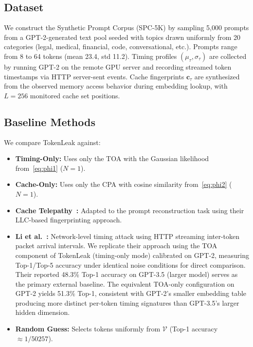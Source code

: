 \documentclass[journal,10pt,twocolumn]{IEEEtran}
\begin{document}
\subsection{Dataset}

We construct the Synthetic Prompt Corpus (SPC-5K) by sampling
5{,}000 prompts from a GPT-2-generated text pool seeded with
topics drawn uniformly from 20 categories (legal, medical,
financial, code, conversational, etc.). Prompts range from
8 to 64 tokens (mean 23.4, std 11.2). Timing profiles
$(\mu_\tau, \sigma_\tau)$ are collected by running GPT-2 on
the remote GPU server and recording streamed token timestamps
via HTTP server-sent events. Cache fingerprints
$\mathbf{c}_\tau$ are synthesized from the observed
memory access behavior during embedding lookup, with
$L=256$ monitored cache set positions.

\subsection{Baseline Methods}

We compare TokenLeak against:

\begin{itemize}
  \item \textbf{Timing-Only:} Uses only the TOA with the
    Gaussian likelihood from~\eqref{eq:phi1} ($N=1$).
  \item \textbf{Cache-Only:} Uses only the CPA with cosine
    similarity from~\eqref{eq:phi2} ($N=1$).
  \item \textbf{Cache Telepathy~\cite{yan2020cache}:} Adapted
    to the prompt reconstruction task using their LLC-based
    fingerprinting approach.
  \item \textbf{Li et al.~\cite{li2024prompt}:} Network-level timing
    attack using HTTP streaming inter-token packet arrival intervals.
    We replicate their approach using the TOA component of TokenLeak
    (timing-only mode) calibrated on GPT-2, measuring Top-1/Top-5
    accuracy under identical noise conditions for direct comparison.
    Their reported 48.3\% Top-1 accuracy on GPT-3.5 (larger model)
    serves as the primary external baseline. The equivalent
    TOA-only configuration on GPT-2 yields 51.3\% Top-1, consistent
    with GPT-2's smaller embedding table producing more distinct
    per-token timing signatures than GPT-3.5's larger hidden dimension.

  \item \textbf{Random Guess:} Selects tokens uniformly from
    $\mathcal{V}$ (Top-1 accuracy $\approx 1/50257$).
\end{itemize}
\end{document}
